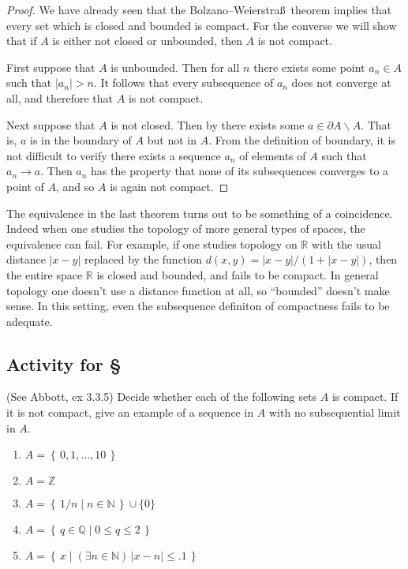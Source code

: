 \documentclass[11pt,oneside]{amsbook}
\newcommand{\set}[1]{\left\{\,#1\,\right\}}
\newcommand{\N}{\mathbb N}
\newcommand{\Z}{\mathbb Z}
\newcommand{\Q}{\mathbb Q}
\newcommand{\R}{\mathbb R}
\renewcommand{\setminus}{\smallsetminus}
\theoremstyle{definition}
\theoremstyle{plain}
\theoremstyle{definition}
\theoremstyle{remark}
\numberwithin{equation}{section}
\numberwithin{figure}{section}
\newcounter{activityitem}
\newenvironment{activity}{\begin{list}{\arabic{activityitem}.}{\usecounter{activityitem}\setlength{\itemsep}{.2in}}}{\end{list}}
\begin{document}
\begin{proof}
  We have already seen that the Bolzano--Weierstra\ss\ theorem implies that every set which is closed and bounded is compact. For the converse we will show that if $A$ is either not closed or unbounded, then $A$ is not compact.

  First suppose that $A$ is unbounded. Then for all $n$ there exists some point $a_n\in A$ such that $|a_n|>n$. It follows that every subsequence of $a_n$ does not converge at all, and therefore that $A$ is not compact.

  Next suppose that $A$ is not closed. Then by there exists some $a\in\partial A\setminus A$. That is, $a$ is in the boundary of $A$ but not in $A$. From the definition of boundary, it is not difficult to verify there exists a sequence $a_n$ of elements of $A$ such that $a_n\to a$. Then $a_n$ has the property that none of its subsequences converges to a point of $A$, and so $A$ is again not compact.
\end{proof}

The equivalence in the last theorem turns out to be something of a coincidence. Indeed when one studies the topology of more general types of spaces, the equivalence can fail. For example, if one studies topology on $\R$ with the usual distance $|x-y|$ replaced by the function $d(x,y)=|x-y|/(1+|x-y|)$, then the entire space $\R$ is closed and bounded, and fails to be compact. In general topology one doesn't use a distance function at all, so ``bounded'' doesn't make sense. In this setting, even the subsequence definiton of compactness fails to be adequate.

\newpage
\subsection*{Activity for \S \thesection}

\begin{activity}
  \item (See Abbott, ex 3.3.5) Decide whether each of the following sets $A$ is compact. If it is not compact, give an example of a sequence in $A$ with no subsequential limit in $A$.
  \begin{enumerate}
    \item $A=\set{0,1,\ldots,10}$
    \item $A=\Z$
    \item $A=\set{1/n\mid n\in\N}\cup\{0\}$
    \item $A=\set{q\in\Q\mid0\leq q\leq2}$
    \item $A=\set{x\mid (\exists n\in\N)\,|x-n|\leq.1}$
  \end{enumerate}
\end{activity}
\end{document}
